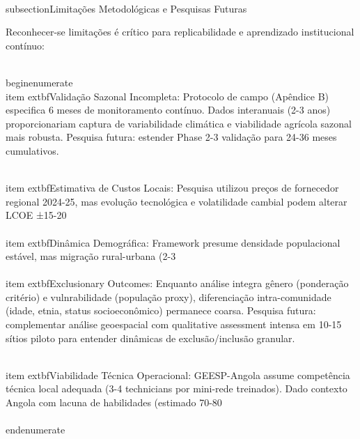 \documentclass[12pt, a4paper]{article}
\begin{document}
{{{{{{{{{{{{\\subsection{Limitações Metodológicas e Pesquisas Futuras}

Reconhecer-se limitações é crítico para replicabilidade e aprendizado institucional contínuo:

\\begin{enumerate}
\\item 	extbf{Validação Sazonal Incompleta}: Protocolo de campo (Apêndice B) especifica 6 meses de monitoramento contínuo. Dados interanuais (2-3 anos) proporcionariam captura de variabilidade climática e viabilidade agrícola sazonal mais robusta. Pesquisa futura: estender Phase 2-3 validação para 24-36 meses cumulativos.

\\item 	extbf{Estimativa de Custos Locais}: Pesquisa utilizou preços de fornecedor regional 2024-25, mas evolução tecnológica e volatilidade cambial podem alterar LCOE ±15-20\\%

\\item 	extbf{Dinâmica Demográfica}: Framework presume densidade populacional estável, mas migração rural-urbana (2-3\\%

\\item 	extbf{Exclusionary Outcomes}: Enquanto análise integra gênero (ponderação critério) e vulnrabilidade (população proxy), diferenciação intra-comunidade (idade, etnia, status socioeconômico) permanece coarsa. Pesquisa futura: complementar análise geoespacial com qualitative assessment intensa em 10-15 sítios piloto para entender dinâmicas de exclusão/inclusão granular.

\\item 	extbf{Viabilidade Técnica Operacional}: GEESP-Angola assume competência técnica local adequada (3-4 technicians por mini-rede treinados). Dado contexto Angola com lacuna de habilidades (estimado 70-80\\%
\\end{enumerate}

}}}}}}}}}}}}
\end{document}
